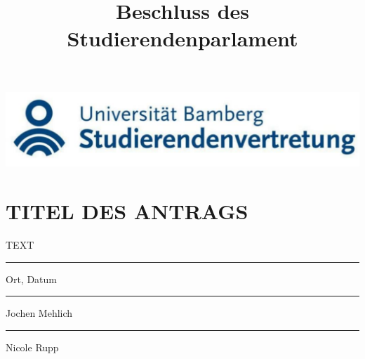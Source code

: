 \documentclass{article}
\title{Beschluss des Studierendenparlament}
\begin{document}
\begin{center}
    \includegraphics[width=\textwidth]{stuve-logo.png}
\end{center}

\section*{TITEL DES ANTRAGS}

\vspace{50px}

TEXT

\vspace{100px}


\parbox{5cm}{\hrule
\strut \centering\footnotesize Ort, Datum} 

\vspace{50px}

\parbox{5cm}{\hrule
\strut \centering\footnotesize Jochen Mehlich} \hfill\parbox{5cm}{\hrule
\strut \centering\footnotesize Nicole Rupp}
\end{document}
